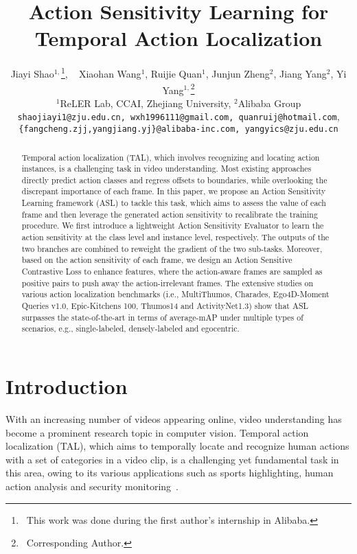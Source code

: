 \documentclass[10pt,twocolumn,letterpaper]{article}
\begin{document}
\title{Action Sensitivity Learning for Temporal Action Localization}



\author{Jiayi Shao$^{1,}$\thanks{~This work was done during the first author's internship in Alibaba.},  ~ Xiaohan Wang$^{1}$, Ruijie Quan$^{1}$, Junjun Zheng$^{2}$, Jiang Yang$^{2}$, Yi Yang$^{1,}$\thanks{~Corresponding Author.} \\
$^1$ReLER Lab, CCAI, Zhejiang University, $^2$Alibaba Group \\
{\tt\small{shaojiayi1@zju.edu.cn, wxh1996111@gmail.com, quanruij@hotmail.com}}, \\ {\tt\small{\{fangcheng.zjj,yangjiang.yj\}@alibaba-inc.com, yangyics@zju.edu.cn}}
 }


\maketitle
\ificcvfinal\thispagestyle{empty}\fi

\begin{abstract}
Temporal action localization (TAL), which involves recognizing and locating action instances, is a challenging task in video understanding.
Most existing approaches directly predict action classes and regress offsets to boundaries, while overlooking the discrepant importance of each frame.
In this paper, we propose an Action Sensitivity Learning framework (ASL) to tackle this task, which aims to assess the value of each frame and then leverage the generated action sensitivity to recalibrate the training procedure. We first introduce a lightweight Action Sensitivity Evaluator to learn the action sensitivity at the class level and instance level, respectively. The outputs of the two branches are combined to reweight the gradient of the two sub-tasks. Moreover, based on the action sensitivity of each frame, we design an Action Sensitive Contrastive Loss to enhance features, where the action-aware frames are sampled as positive pairs to push away the action-irrelevant frames. The extensive studies on various action localization benchmarks (i.e., MultiThumos, Charades, Ego4D-Moment Queries v1.0, Epic-Kitchens 100, Thumos14 and ActivityNet1.3) show that ASL surpasses the state-of-the-art in terms of average-mAP under multiple types of scenarios, e.g., single-labeled, densely-labeled and egocentric. 

\end{abstract}

\vspace{-0.5em}
\section{Introduction}
With an increasing number of videos appearing online, video understanding has become a prominent research topic in computer vision. Temporal action localization (TAL), which aims to temporally locate and recognize human actions with a set of categories in a video clip,  is a challenging yet fundamental task in this area, owing to its various applications such as sports highlighting, human action analysis and security monitoring~\cite{app1,app2,app3,app4,app5}.
\end{document}
